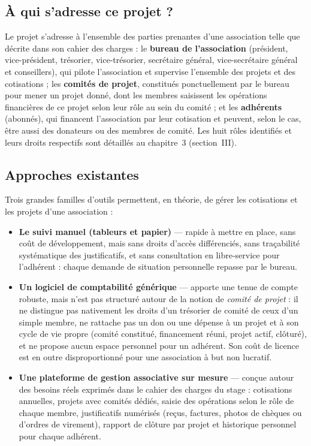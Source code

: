 \subsection{À qui s'adresse ce projet ?}

Le projet s'adresse à l'ensemble des parties prenantes d'une association
telle que décrite dans son cahier des charges : le \textbf{bureau de
l'association} (président, vice-président, trésorier, vice-trésorier,
secrétaire général, vice-secrétaire général et conseillers), qui pilote
l'association et supervise l'ensemble des projets et des cotisations ; les
\textbf{comités de projet}, constitués ponctuellement par le bureau pour
mener un projet donné, dont les membres saisissent les opérations financières
de ce projet selon leur rôle au sein du comité ; et les \textbf{adhérents}
(abonnés), qui financent l'association par leur cotisation et peuvent, selon
le cas, être aussi des donateurs ou des membres de comité. Les huit rôles
identifiés et leurs droits respectifs sont détaillés au chapitre~3
(section~III).

\subsection{Approches existantes}

Trois grandes familles d'outils permettent, en théorie, de gérer les
cotisations et les projets d'une association :

\begin{itemize}
  \item \textbf{Le suivi manuel (tableurs et papier)} — rapide à mettre en
    place, sans coût de développement, mais sans droits d'accès
    différenciés, sans traçabilité systématique des justificatifs, et sans
    consultation en libre-service pour l'adhérent : chaque demande de
    situation personnelle repasse par le bureau.

  \item \textbf{Un logiciel de comptabilité générique} — apporte une
    tenue de compte robuste, mais n'est pas structuré autour de la notion
    de \emph{comité de projet} : il ne distingue pas nativement les droits
    d'un trésorier de comité de ceux d'un simple membre, ne rattache pas un
    don ou une dépense à un projet et à son cycle de vie propre (comité
    constitué, financement réuni, projet actif, clôturé), et ne propose
    aucun espace personnel pour un adhérent. Son coût de licence est en
    outre disproportionné pour une association à but non lucratif.

  \item \textbf{Une plateforme de gestion associative sur mesure} —
    conçue autour des besoins réels exprimés dans le cahier des charges du
    stage : cotisations annuelles, projets avec comités dédiés, saisie des
    opérations selon le rôle de chaque membre, justificatifs numérisés
    (reçus, factures, photos de chèques ou d'ordres de virement), rapport de
    clôture par projet et historique personnel pour chaque adhérent.
\end{itemize}

